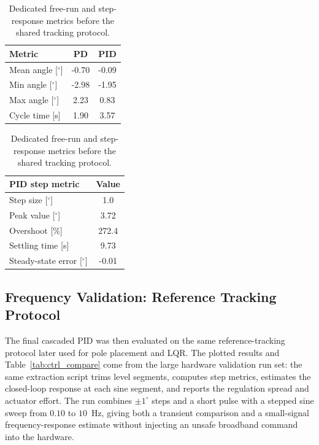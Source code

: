 \documentclass[11pt,a4paper]{article}
\begin{document}
\begin{table}[H]
\centering
\caption*{\textbf{PD/PID Hardware Time Runs Comparison}}
\begin{minipage}{0.48\linewidth}
\centering
\begin{tabular}{|l c c|}
\hline
\rowcolor{bluePoli!40}
\textbf{Metric} & \textbf{PD} & \textbf{PID} \T\B \\
\hline \hline
Mean angle [$^\circ$] & -0.70 & -0.09 \T\B \\
Min angle [$^\circ$] & -2.98 & -1.95 \T\B \\
Max angle [$^\circ$] & 2.23 & 0.83 \T\B \\
Cycle time [s] & 1.90 & 3.57 \B \\
\hline
\end{tabular}
\end{minipage}
\hfill
\begin{minipage}{0.43\linewidth}
\centering
\begin{tabular}{|l c|}
\hline
\rowcolor{bluePoli!40}
\textbf{PID step metric} & \textbf{Value} \T\B \\
\hline \hline
Step size [$^\circ$] & 1.0 \T\B \\
Peak value [$^\circ$] & 3.72 \T\B \\
Overshoot [\%] & 272.4 \T\B \\
Settling time [s] & 9.73 \T\B \\
Steady-state error [$^\circ$] & -0.01 \B \\
\hline
\end{tabular}
\end{minipage}
\caption{Dedicated free-run and step-response metrics before the shared tracking protocol.}
\label{table:pid_preprotocol_metrics}
\end{table}

\subsection{Frequency Validation: Reference Tracking Protocol}
The final cascaded PID was then evaluated on the same reference-tracking protocol later used for pole placement and LQR. The plotted results and Table~\ref{tab:ctrl_compare} come from the large hardware validation run set: the same extraction script trims level segments, computes step metrics, estimates the closed-loop response at each sine segment, and reports the regulation spread and actuator effort. The run combines $\pm1^\circ$ steps and a short pulse with a stepped sine sweep from $0.10$ to $10$~Hz, giving both a transient comparison and a small-signal frequency-response estimate without injecting an unsafe broadband command into the hardware.
\end{document}

